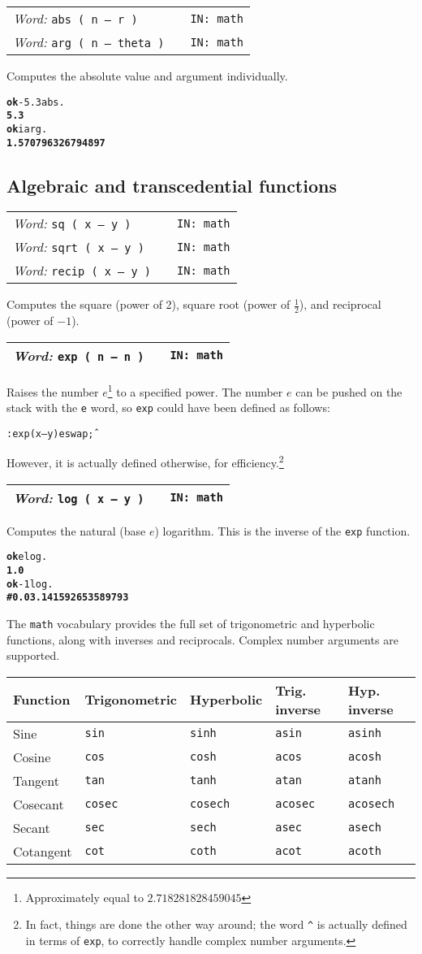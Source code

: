 \documentclass{report}
\newcommand{\tto}{\symbol{123}}
\newcommand{\ttc}{\symbol{125}}
\newcommand{\ordinaryword}[3]{\index{#1}
\emph{Word:} \texttt{#2} &&\texttt{IN: #3}}
\newcommand{\wordtable}[1]{

\begin{tabularx}{12cm}[t]{lXr}
\hline
#1\\
\hline
\end{tabularx}

}
\begin{document}
\wordtable{
\ordinaryword{abs}{abs ( n -- r )}{math}\\
\ordinaryword{arg}{arg ( n -- theta )}{math}
}
Computes the absolute value and argument individually.
\begin{alltt}
\textbf{ok} -5.3 abs .
\textbf{5.3}
\textbf{ok} i arg .
\textbf{1.570796326794897}
\end{alltt}

\subsection{Algebraic and transcedential functions}

\wordtable{
\ordinaryword{sq}{sq ( x -- y )}{math}\\
\ordinaryword{sqrt}{sqrt ( x -- y )}{math}\\
\ordinaryword{recip}{recip ( x -- y )}{math}
}
Computes the square (power of 2), square root (power of $\frac{1}{2}$), and reciprocal (power of $-1$).
\wordtable{
\ordinaryword{exp}{exp ( n -- n )}{math}
}
Raises the number $e$\footnote{Approximately equal to $2.718281828459045$} to a specified power. The number $e$ can be pushed on the stack with the \texttt{e} word, so \texttt{exp} could have been defined as follows:

\begin{alltt}
: exp ( x -- y ) e swap \^ ;
\end{alltt}

However, it is actually defined otherwise, for efficiency.\footnote{In fact, things are done the other way around; the word \texttt{\^{}} is actually defined in terms of \texttt{exp}, to correctly handle complex number arguments.}
\wordtable{
\ordinaryword{log}{log ( x -- y )}{math}
}
Computes the natural (base $e$) logarithm. This is the inverse of the \texttt{exp} function.
\begin{alltt}
\textbf{ok} e log .
\textbf{1.0}
\textbf{ok} -1 log .
\textbf{\#\tto 0.0 3.141592653589793 \ttc}
\end{alltt}
The \texttt{math} vocabulary provides the full set of trigonometric and hyperbolic functions, along with inverses and reciprocals. Complex number arguments are supported.

\begin{tabular}{l|l|l|l|l}
Function&Trigonometric&Hyperbolic&Trig. inverse&Hyp. inverse\\
\hline
Sine&\texttt{sin}&\texttt{sinh}&\texttt{asin}&\texttt{asinh}\\
Cosine&\texttt{cos}&\texttt{cosh}&\texttt{acos}&\texttt{acosh}\\
Tangent&\texttt{tan}&\texttt{tanh}&\texttt{atan}&\texttt{atanh}\\
\hline
Cosecant&\texttt{cosec}&\texttt{cosech}&\texttt{acosec}&\texttt{acosech}\\
Secant&\texttt{sec}&\texttt{sech}&\texttt{asec}&\texttt{asech}\\
Cotangent&\texttt{cot}&\texttt{coth}&\texttt{acot}&\texttt{acoth}
\end{tabular}
\end{document}
